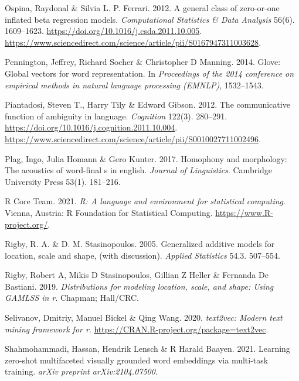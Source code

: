 \documentclass[
]{article}
\newlength{\cslhangindent}
\newlength{\cslentryspacingunit} %
\newenvironment{CSLReferences}[2] %
 {%
  \setlength{\parindent}{0pt}
  \ifodd #1
  \let\oldpar\par
  \def\par{\hangindent=\cslhangindent\oldpar}
  \fi
  \setlength{\parskip}{#2\cslentryspacingunit}
 }%
 {}
\begin{document}
\begin{CSLReferences}{1}{0}
\leavevmode{}%
Ospina, Raydonal \& Silvia L. P. Ferrari. 2012. A general class of
zero-or-one inflated beta regression models. \emph{Computational
Statistics \& Data Analysis} 56(6). 1609--1623.
\url{https://doi.org/10.1016/j.csda.2011.10.005}.
\url{https://www.sciencedirect.com/science/article/pii/S0167947311003628}.

\leavevmode{}%
Pennington, Jeffrey, Richard Socher \& Christopher D Manning. 2014.
Glove: Global vectors for word representation. In \emph{Proceedings of
the 2014 conference on empirical methods in natural language processing
(EMNLP)}, 1532--1543.

\leavevmode{}%
Piantadosi, Steven T., Harry Tily \& Edward Gibson. 2012. The
communicative function of ambiguity in language. \emph{Cognition}
122(3). 280--291. \url{https://doi.org/10.1016/j.cognition.2011.10.004}.
\url{https://www.sciencedirect.com/science/article/pii/S0010027711002496}.

\leavevmode{}%
Plag, Ingo, Julia Homann \& Gero Kunter. 2017. Homophony and morphology:
The acoustics of word-final s in english. \emph{Journal of Linguistics}.
Cambridge University Press 53(1). 181--216.

\leavevmode{}%
R Core Team. 2021. \emph{R: A language and environment for statistical
computing}. Vienna, Austria: R Foundation for Statistical Computing.
\url{https://www.R-project.org/}.

\leavevmode{}%
Rigby, R. A. \& D. M. Stasinopoulos. 2005. Generalized additive models
for location, scale and shape, (with discussion). \emph{Applied
Statistics} 54.3. 507--554.

\leavevmode{}%
Rigby, Robert A, Mikis D Stasinopoulos, Gillian Z Heller \& Fernanda De
Bastiani. 2019. \emph{Distributions for modeling location, scale, and
shape: Using GAMLSS in r}. Chapman; Hall/CRC.

\leavevmode{}%
Selivanov, Dmitriy, Manuel Bickel \& Qing Wang. 2020. \emph{text2vec:
Modern text mining framework for r}.
\url{https://CRAN.R-project.org/package=text2vec}.

\leavevmode{}%
Shahmohammadi, Hassan, Hendrik Lensch \& R Harald Baayen. 2021. Learning
zero-shot multifaceted visually grounded word embeddings via multi-task
training. \emph{arXiv preprint arXiv:2104.07500}.


\end{CSLReferences}
\end{document}
